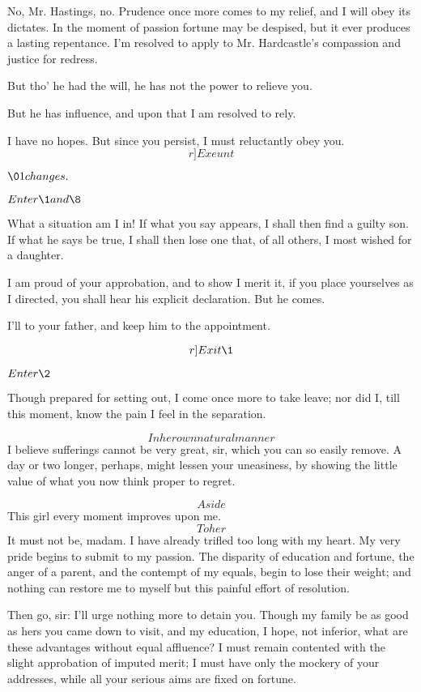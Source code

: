 \documentclass{book}
\begin{document}
\9  No, Mr. Hastings, no.  Prudence once more comes to my
relief, and I will obey its dictates.  In the moment of passion fortune
may be despised, but it ever produces a lasting repentance.  I'm
resolved to apply to Mr. Hardcastle's compassion and justice for
redress.

\4  But tho' he had the will, he has not the power to relieve
you.

\9  But he has influence, and upon that I am resolved to
rely.

\4  I have no hopes.  But since you persist, I must reluctantly
obey you.  \[r]Exeunt\]


\(\01 changes.\)


\(Enter \1 and \8\)


\1  What a situation am I in!  If what you say appears, I
shall then find a guilty son.  If what he says be true, I shall then
lose one that, of all others, I most wished for a daughter.

\8  I am proud of your approbation, and to show I merit
it, if you place yourselves as I directed, you shall hear his explicit
declaration.  But he comes.

\1  I'll to your father, and keep him to the appointment. 

\[r]Exit \1\]


\(Enter \2\)


\2  Though prepared for setting out, I come once more to take
leave; nor did I, till this moment, know the pain I feel in the
separation.

\8  \[In her own natural manner\]  I believe sufferings
cannot be very great, sir, which you can so easily remove.  A day or
two longer, perhaps, might lessen your uneasiness, by showing the
little value of what you now think proper to regret.

\2  \[Aside\]  This girl every moment improves upon me.  \[To her\] 
It must not be, madam.  I have already trifled too long with my heart. 
My very pride begins to submit to my passion.  The disparity of
education and fortune, the anger of a parent, and the contempt of my
equals, begin to lose their weight; and nothing can restore me to
myself but this painful effort of resolution.

\8  Then go, sir:  I'll urge nothing more to detain you. 
Though my family be as good as hers you came down to visit, and my
education, I hope, not inferior, what are these advantages without
equal affluence?  I must remain contented with the slight approbation
of imputed merit; I must have only the mockery of your addresses, while
all your serious aims are fixed on fortune.
\end{document}
